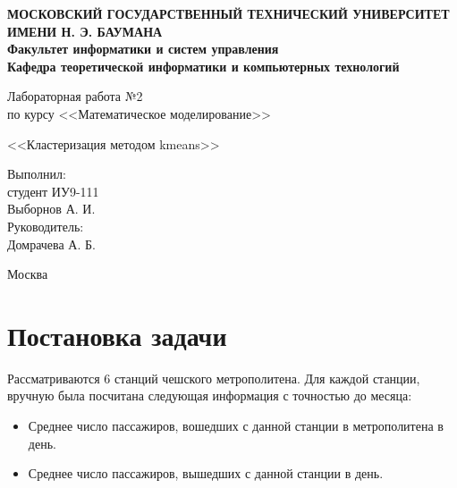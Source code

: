 \documentclass[12pt,a4paper,oneside]{extarticle}
\begin{document}
\pgfplotsset{compat=1.8}

\thispagestyle{empty}
\newpage
{
\centering


\textbf{
МОСКОВСКИЙ ГОСУДАРСТВЕННЫЙ ТЕХНИЧЕСКИЙ УНИВЕРСИТЕТ ИМЕНИ Н. Э. БАУМАНА \\
Факультет информатики и систем управления \\
Кафедра теоретической информатики и компьютерных технологий}
\bigskip
\bigskip
\bigskip
\bigskip
\bigskip
\bigskip
\bigskip

\vfill


Лабораторная работа №2 \\
по курсу <<Математическое моделирование>>

\bigskip

{\large <<Кластеризация методом kmeans>>}
\bigskip

\vfill



\hfill\parbox{4cm} {
Выполнил:\\
студент ИУ9-111 \hfill \\
Выборнов А. И.\hfill \medskip\\
Руководитель:\\
Домрачева А. Б.\hfill
}


\vspace{\fill}

Москва \number\year
\clearpage
}



\clearpage


\section{Постановка задачи}
    Рассматриваются 6 станций чешского метрополитена. Для каждой станции, вручную была посчитана следующая информация с точностью до месяца:
    \begin{itemize}
        \item Среднее число пассажиров, вошедших с данной станции в метрополитена в день.
        \item Среднее число пассажиров, вышедших с данной станции в день.
    \end{itemize}
\end{document}

